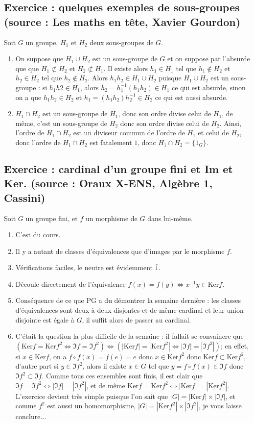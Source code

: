 \documentclass[17pt]{article}
\def\Ker{\text{Ker}}
\def\ssi{\Leftrightarrow}
\begin{document}
	\subsection*{Exercice : quelques exemples de sous-groupes (source : Les maths en tête, Xavier Gourdon)}
	Soit $G$ un groupe, $H_1$ et $H_2$ deux sous-groupes de $G$.
	\begin{enumerate}
		\item On suppose que $H_1\cup H_2$ est un sous-groupe de $G$ et on suppose par l'absurde que que $H_1\not\subset H_2$ et $H_2\not\subset H_1$. Il existe alors $h_1\in H_1$ tel que $h_1\notin H_2$ et $h_2\in H_2$ tel que $h_2\notin H_2$. Alors $h_1h_2\in H_1\cup H_2$ puisque $H_1\cup H_2$ est un sous-groupe : si $h_1h2\in H_1$, alors $h_2=h_1^{-1}(h_1h_2)\in H_1$ ce qui est absurde, sinon on a que $h_1h_2\in H_2$ et $h_1=(h_1h_2)h_2^{-1}\in H_2$ ce qui est aussi absurde.
		\item $H_1\cap H_2$ est un sous-groupe de $H_1$, donc son ordre divise celui de $H_1$, de même, c'est un sous-groupe de $H_2$ donc son ordre divise celui de $H_2$. Ainsi, l'ordre de $H_1\cap H_2$ est un diviseur commun de l'ordre de $H_1$ et celui de $H_2$, donc l'ordre de $H_1\cap H_2$ est fatalement $1$, donc $H_1\cap H_2=\lbrace 1_G\rbrace$.
	\end{enumerate}
	\subsection*{Exercice : cardinal d'un groupe fini et Im et Ker. (source : Oraux X-ENS, Algèbre 1, Cassini)}
	Soit $G$ un groupe fini, et $f$ un morphisme de $G$ dans lui-même.
	\begin{enumerate}
		\item C'est du cours.
		\item Il y a autant de classes d'équivalences que d'images par le morphisme $f$.
		\item Vérifications faciles, le neutre est évidemment $\bar{1}$.
		\item Découle directement de l'équivalence $f(x)=f(y)\ssi x^{-1}y\in \Ker f$.
		\item Conséquence de ce que PG a du démontrer la semaine dernière : les classes d'équivalences sont deux à deux disjontes et de même cardinal et leur union disjointe est égale à $G$, il suffit alors de passer au cardinal.
		\item C'était la question la plus difficile de la semaine : il fallait se convaincre que $(\Ker f=\Ker f^2\ssi \Im f=\Im f^2)\ssi (|\Ker f|=|\Ker f^2|\ssi |\Im f|=|\Im f^2|)$; en effet, si $x\in \Ker f$, on a $f\circ f(x)=f(e)=e$ donc $x\in \Ker f^2$ donc $\Ker f\subset \Ker f^2$, d'autre part si $y\in \Im f^2$, alors il existe $x\in G$ tel que $y=f\circ f(x)\in \Im f$ donc $\Im f^2\subset \Im f$. Comme tous ces ensembles sont finis, il est clair que $\Im f=\Im f^2\ssi |\Im f|=|\Im f^2|$, et de même $\Ker f=\Ker f^2\ssi |\Ker f|=|\Ker f^2|$. L'exercice devient très simple puisque l'on sait que $|G|=|\Ker f|\times |\Im f|$, et comme $f^2$ est aussi un homomorphisme, $|G|=|\Ker f^2|\times |\Im f^2|$, je vous laisse conclure...
	\end{enumerate}
\end{document}
